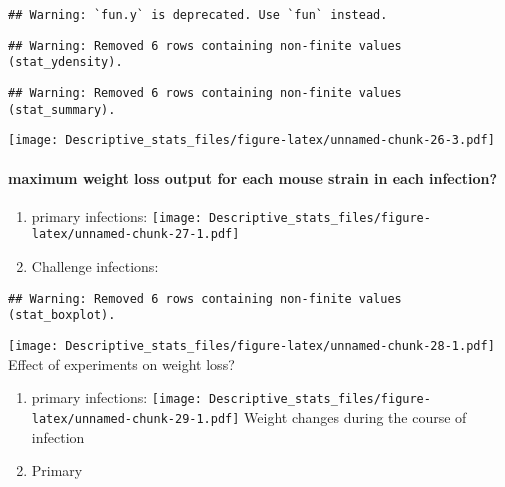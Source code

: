 \documentclass[
]{article}
\providecommand{\tightlist}{%
  \setlength{\itemsep}{0pt}\setlength{\parskip}{0pt}}
\begin{document}
\begin{verbatim}
## Warning: `fun.y` is deprecated. Use `fun` instead.
\end{verbatim}

\begin{verbatim}
## Warning: Removed 6 rows containing non-finite values (stat_ydensity).
\end{verbatim}

\begin{verbatim}
## Warning: Removed 6 rows containing non-finite values (stat_summary).
\end{verbatim}

\texttt{[image: Descriptive\_stats\_files/figure-latex/unnamed-chunk-26-3.pdf]}

\hypertarget{maximum-weight-loss-output-for-each-mouse-strain-in-each-infection}{%
\paragraph{maximum weight loss output for each mouse strain in each
infection?}\label{maximum-weight-loss-output-for-each-mouse-strain-in-each-infection}}

\begin{enumerate}
\def\labelenumi{\arabic{enumi}.}
\item
  primary infections:
  \texttt{[image: Descriptive\_stats\_files/figure-latex/unnamed-chunk-27-1.pdf]}
\item
  Challenge infections:
\end{enumerate}

\begin{verbatim}
## Warning: Removed 6 rows containing non-finite values (stat_boxplot).
\end{verbatim}

\texttt{[image: Descriptive\_stats\_files/figure-latex/unnamed-chunk-28-1.pdf]}
Effect of experiments on weight loss?

\begin{enumerate}
\def\labelenumi{\arabic{enumi}.}
\tightlist
\item
  primary infections:
  \texttt{[image: Descriptive\_stats\_files/figure-latex/unnamed-chunk-29-1.pdf]}
  Weight changes during the course of infection
\item
  Primary
\end{enumerate}
\end{document}
